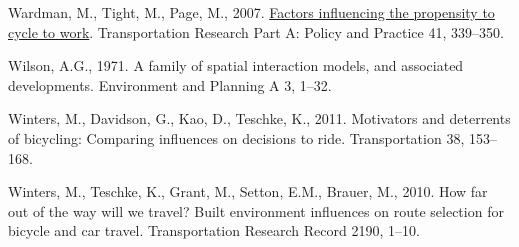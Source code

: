 \documentclass[
]{article}
\newlength{\cslhangindent}
\newlength{\cslentryspacingunit} %
\newenvironment{CSLReferences}[2] %
 {%
  \setlength{\parindent}{0pt}
  \ifodd #1
  \let\oldpar\par
  \def\par{\hangindent=\cslhangindent\oldpar}
  \fi
  \setlength{\parskip}{#2\cslentryspacingunit}
 }%
 {}
\begin{document}
\begin{CSLReferences}{1}{0}
\leavevmode{}%
Wardman, M., Tight, M., Page, M., 2007. \href{https://doi.org/10.1016/j.tra.2006.09.011}{Factors influencing the propensity to cycle to work}. Transportation Research Part A: Policy and Practice 41, 339--350.

\leavevmode{}%
Wilson, A.G., 1971. A family of spatial interaction models, and associated developments. Environment and Planning A 3, 1--32.

\leavevmode{}%
Winters, M., Davidson, G., Kao, D., Teschke, K., 2011. Motivators and deterrents of bicycling: Comparing influences on decisions to ride. Transportation 38, 153--168.

\leavevmode{}%
Winters, M., Teschke, K., Grant, M., Setton, E.M., Brauer, M., 2010. How far out of the way will we travel? Built environment influences on route selection for bicycle and car travel. Transportation Research Record 2190, 1--10.

\end{CSLReferences}
\end{document}
